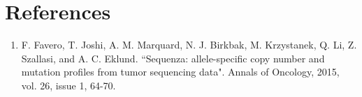 
\newpage


\section{References}

\begin{enumerate}
  \item F. Favero, T. Joshi, A. M. Marquard, N. J. Birkbak, M. Krzystanek, Q. Li, Z. Szallasi, and A. C. Eklund. ``Sequenza: allele-specific copy number and mutation profiles from tumor sequencing data". Annals of Oncology, 2015, vol. 26, issue 1, 64-70.
\end{enumerate}
